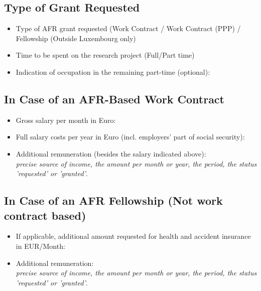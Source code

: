 % 

\subsection{Type of Grant Requested}

\begin{itemize}
  \item Type of AFR grant requested (Work Contract / Work Contract (PPP) / Fellowship (Outside Luxembourg only)
  \item Time to be spent on the research project (Full/Part time)
  \item Indication of occupation in the remaining part-time (optional):
\end{itemize}

\subsection{In Case of an AFR-Based Work Contract}

\begin{itemize}
  \item Gross salary per month in Euro:
  \item Full salary costs per year in Euro (incl. employers' part of social
    security):
  \item Additional remuneration (besides the salary indicated above):\\
    \emph{precise source of income, the amount per month or year,
      the period, the status 'requested' or 'granted'}.
\end{itemize}

\subsection{In Case of an AFR Fellowship (Not work contract based)}

\begin{itemize}
  \item If applicable, additional amount requested for health and accident insurance in EUR/Month:
  \item  Additional remuneration:\\
    \emph{precise source of income, the amount per month or year,
      the period, the status 'requested' or 'granted'}.
\end{itemize}


